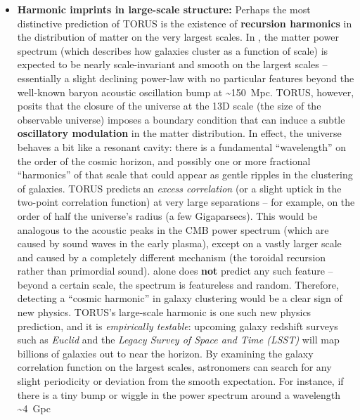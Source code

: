 \documentclass[
]{article}
\begin{document}
{\begin{itemize}
\item
  \textbf{Harmonic imprints in large-scale structure:} Perhaps the most
  distinctive prediction of TORUS is the existence of \textbf{recursion
  harmonics} in the distribution of matter on the very largest scales.
  In \LambdaCDM, the matter power spectrum (which describes how galaxies
  cluster as a function of scale) is expected to be nearly
  scale-invariant and smooth on the largest scales -- essentially a
  slight declining power-law with no particular features beyond the
  well-known baryon acoustic oscillation bump at \textasciitilde150~Mpc.
  TORUS, however, posits that the closure of the universe at the 13D
  scale (the size of the observable universe) imposes a boundary
  condition that can induce a subtle \textbf{oscillatory modulation} in
  the matter distribution\hspace{0pt}. In effect, the universe behaves a
  bit like a resonant cavity: there is a fundamental ``wavelength'' on
  the order of the cosmic horizon, and possibly one or more fractional
  ``harmonics'' of that scale that could appear as gentle ripples in the
  clustering of galaxies. TORUS predicts an \emph{excess correlation}
  (or a slight uptick in the two-point correlation function) at very
  large separations -- for example, on the order of half the universe's
  radius (a few Gigaparsecs)\hspace{0pt}. This would be analogous to the
  acoustic peaks in the CMB power spectrum (which are caused by sound
  waves in the early plasma), except on a vastly larger scale and caused
  by a completely different mechanism (the toroidal recursion rather
  than primordial sound). \LambdaCDM alone does \textbf{not} predict any such
  feature -- beyond a certain scale, the \LambdaCDM spectrum is featureless
  and random. Therefore, detecting a ``cosmic harmonic'' in galaxy
  clustering would be a clear sign of new physics. TORUS's large-scale
  harmonic is one such new physics prediction, and it is
  \emph{empirically testable}: upcoming galaxy redshift surveys such as
  \emph{Euclid} and the \emph{Legacy Survey of Space and Time (LSST)}
  will map billions of galaxies out to near the horizon. By examining
  the galaxy correlation function on the largest scales, astronomers can
  search for any slight periodicity or deviation from the smooth \LambdaCDM
  expectation\hspace{0pt}. For instance, if there is a tiny bump or
  wiggle in the power spectrum around a wavelength \textasciitilde4~Gpc

\end{itemize}}
\end{document}
